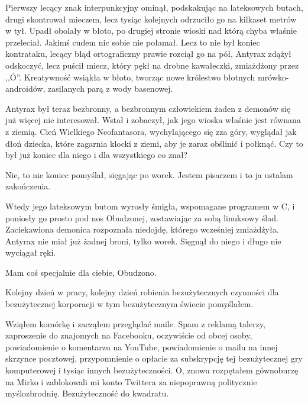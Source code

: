 Pierwszy lecący znak interpunkcyjny ominął, podskakując na lateksowych butach, drugi skontrował mieczem, lecz tysiąc kolejnych odrzuciło go na kilkaset metrów w tył.
Upadł obolały w błoto, po drugiej stronie wioski nad którą chyba właśnie przeleciał. Jakimś cudem nic sobie nie połamał.
Lecz to nie był koniec kontrataku, lecący błąd ortograficzny prawie rozciął go na pół, Antyrax zdążył odskoczyć, lecz puścił miecz, który pękł na drobne kawałeczki, zmiażdżony przez ,,Ó''.
Kreatywność wsiąkła w błoto, tworząc nowe królestwo błotnych mrówko-androidów, zasilanych parą z wody basenowej.

Antyrax był teraz bezbronny, a bezbronnym człowiekiem żaden z demonów się już więcej nie interesował. Wstał i zobaczył, jak jego wioska właśnie jest równana z ziemią.
Cień Wielkiego Neofantasora, wychylającego się zza góry, wyglądał jak dłoń dziecka, które zagarnia klocki z ziemi, aby je zaraz obślinić i połknąć.
Czy to był już koniec dla niego i dla wszystkiego co znał?

\begin{dialogue}
\ds Nie, to nie koniec \dm pomyślał, sięgając po worek. \dm Jestem pisarzem i to ja ustalam zakończenia. 
\end{dialogue}

Wtedy jego lateksowym butom wyrosły śmigła, wspomagane programem w C, i poniosły go prosto pod nos Obudzonej, zostawiając za sobą linuksowy ślad.
Zaciekawiona demonica rozpoznała niedojdę, którego wcześniej zmiażdżyła.
Antyrax nie miał już żadnej broni, tylko worek. Sięgnął do niego i długo nie wyciągał ręki.
\begin{dialogue}
\ds{} Mam coś specjalnie dla ciebie, Obudzono.
\end{dialogue}

\divider{}

\begin{dialogue}
\ds{} Kolejny dzień w pracy, kolejny dzień robienia bezużytecznych czynności dla bezużytecznej korporacji w tym bezużytecznym świecie \dm{} pomyślałem.
\end{dialogue}

Wziąłem komórkę i zacząłem przeglądać maile.
Spam z reklamą talerzy, zaproszenie do znajomych na Facebooku, oczywiście od obcej osoby, powiadomienie o komentarzu na YouTube,
powiadomienie o mailu na innej skrzynce pocztowej, przypomnienie o opłacie za subskrypcję tej bezużytecznej gry komputerowej i tysiąc innych bezużyteczności.
O, znowu rozpętałem gównoburzę na Mirko i zablokowali mi konto Twittera za niepoprawną politycznie myślozbrodnię.
Bezużyteczność do kwadratu.

